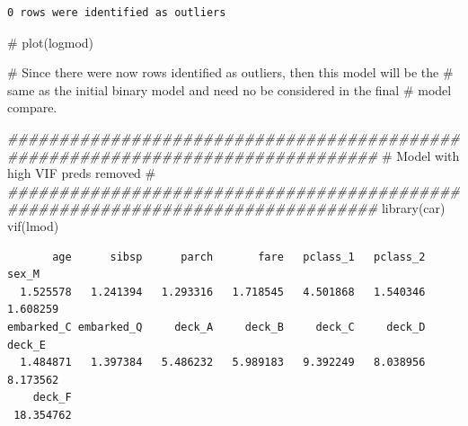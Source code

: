 \documentclass[
  letterpaper,
  DIV=11,
  numbers=noendperiod]{scrartcl}
\newenvironment{Shaded}{\begin{snugshade}}{\end{snugshade}}
\newcommand{\AttributeTok}[1]{\textcolor[rgb]{0.40,0.45,0.13}{#1}}
\newcommand{\CommentTok}[1]{\textcolor[rgb]{0.37,0.37,0.37}{#1}}
\newcommand{\DocumentationTok}[1]{\textcolor[rgb]{0.37,0.37,0.37}{\textit{#1}}}
\newcommand{\FunctionTok}[1]{\textcolor[rgb]{0.28,0.35,0.67}{#1}}
\newcommand{\NormalTok}[1]{\textcolor[rgb]{0.00,0.23,0.31}{#1}}
\newcommand{\OtherTok}[1]{\textcolor[rgb]{0.00,0.23,0.31}{#1}}
\newcommand{\SpecialCharTok}[1]{\textcolor[rgb]{0.37,0.37,0.37}{#1}}
\newcommand{\StringTok}[1]{\textcolor[rgb]{0.13,0.47,0.30}{#1}}
\begin{document}
\begin{Shaded}
\end{Shaded}

\begin{verbatim}
0 rows were identified as outliers
\end{verbatim}

\begin{Shaded}
\begin{Highlighting}[]
\CommentTok{\# plot(logmod)}

\CommentTok{\# Since there were now rows identified as outliers, then this model will be the }
\CommentTok{\# same as the initial binary model and need no be considered in the final }
\CommentTok{\# model compare.}

\DocumentationTok{\#\#\#\#\#\#\#\#\#\#\#\#\#\#\#\#\#\#\#\#\#\#\#\#\#\#\#\#\#\#\#\#\#\#\#\#\#\#\#\#\#\#\#\#\#\#\#\#\#\#\#\#\#\#\#\#\#\#\#\#\#\#\#\#\#\#\#\#\#\#\#\#\#\#\#\#\#\#\#\#}
\CommentTok{\#                Model with high VIF preds removed                             \# }
\DocumentationTok{\#\#\#\#\#\#\#\#\#\#\#\#\#\#\#\#\#\#\#\#\#\#\#\#\#\#\#\#\#\#\#\#\#\#\#\#\#\#\#\#\#\#\#\#\#\#\#\#\#\#\#\#\#\#\#\#\#\#\#\#\#\#\#\#\#\#\#\#\#\#\#\#\#\#\#\#\#\#\#\#}
\FunctionTok{library}\NormalTok{(car)}
\FunctionTok{vif}\NormalTok{(lmod)}
\end{Highlighting}
\end{Shaded}

\begin{verbatim}
       age      sibsp      parch       fare   pclass_1   pclass_2      sex_M 
  1.525578   1.241394   1.293316   1.718545   4.501868   1.540346   1.608259 
embarked_C embarked_Q     deck_A     deck_B     deck_C     deck_D     deck_E 
  1.484871   1.397384   5.486232   5.989183   9.392249   8.038956   8.173562 
    deck_F 
 18.354762 
\end{verbatim}
\end{document}
